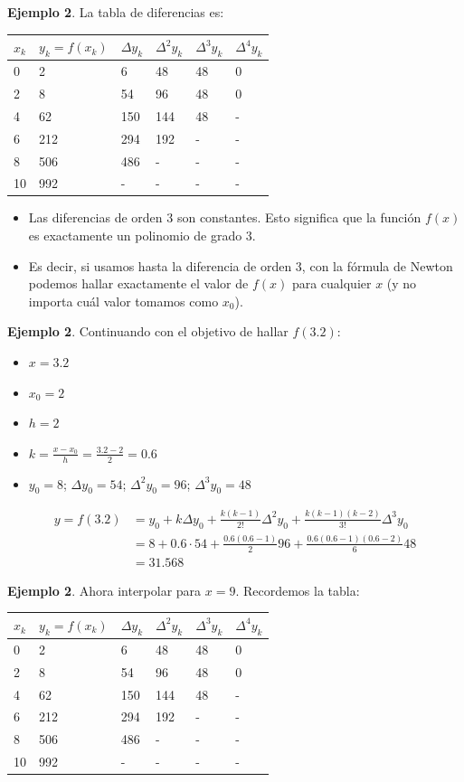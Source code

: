 \documentclass[openany]{book}
\providecommand{\tightlist}{%
  \setlength{\itemsep}{0pt}\setlength{\parskip}{0pt}}
\begin{document}
\textbf{Ejemplo 2}. La tabla de diferencias es:

\begin{longtable}[]{@{}llllll@{}}
\toprule
\(x_k\) & \(y_k=f(x_k)\) & \(\Delta y_k\) & \(\Delta^2 y_k\) & \(\Delta^3 y_k\) & \(\Delta^4 y_k\)\tabularnewline
\midrule
\endhead
0 & 2 & 6 & 48 & 48 & 0\tabularnewline
2 & 8 & 54 & 96 & 48 & 0\tabularnewline
4 & 62 & 150 & 144 & 48 & -\tabularnewline
6 & 212 & 294 & 192 & - & -\tabularnewline
8 & 506 & 486 & - & - & -\tabularnewline
10 & 992 & - & - & - & -\tabularnewline
\bottomrule
\end{longtable}

\begin{itemize}
\tightlist
\item
  Las diferencias de orden 3 son constantes. Esto significa que la función \(f(x)\) es exactamente un polinomio de grado 3.
\item
  Es decir, si usamos hasta la diferencia de orden 3, con la fórmula de Newton podemos hallar exactamente el valor de \(f(x)\) para cualquier \(x\) (y no importa cuál valor tomamos como \(x_0\)).
\end{itemize}

\textbf{Ejemplo 2}. Continuando con el objetivo de hallar \(f(3.2)\):

\begin{itemize}
\tightlist
\item
  \(x = 3.2\)
\item
  \(x_0 = 2\)
\item
  \(h = 2\)
\item
  \(k = \frac{x-x_0}{h} = \frac{3.2-2}{2} = 0.6\)
\item
  \(y_0 = 8\); \(\Delta y_0 = 54\); \(\Delta^2 y_0 = 96\); \(\Delta^3 y_0 = 48\)
\end{itemize}

\[
\begin{aligned}
y = f(3.2) &= y_0 + k \Delta y_0 + \frac{k(k-1)}{2!}\Delta^2 y_0 + \frac{k(k-1)(k-2)}{3!}\Delta^3 y_0\\
  & = 8 + 0.6 \cdot 54 + \frac{0.6 (0.6-1)}{2} 96 + \frac{0.6 (0.6-1)(0.6-2)}{6} 48 \\
  & = 31.568
\end{aligned}
\]

\textbf{Ejemplo 2}. Ahora interpolar para \(x = 9\). Recordemos la tabla:

\begin{longtable}[]{@{}llllll@{}}
\toprule
\(x_k\) & \(y_k=f(x_k)\) & \(\Delta y_k\) & \(\Delta^2 y_k\) & \(\Delta^3 y_k\) & \(\Delta^4 y_k\)\tabularnewline
\midrule
\endhead
0 & 2 & 6 & 48 & 48 & 0\tabularnewline
2 & 8 & 54 & 96 & 48 & 0\tabularnewline
4 & 62 & 150 & 144 & 48 & -\tabularnewline
6 & 212 & 294 & 192 & - & -\tabularnewline
8 & 506 & 486 & - & - & -\tabularnewline
10 & 992 & - & - & - & -\tabularnewline
\bottomrule
\end{longtable}
\end{document}
